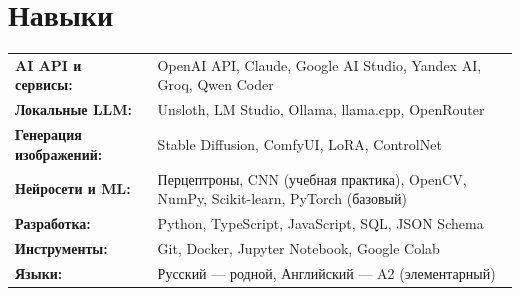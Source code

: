 \documentclass[10pt,a4paper]{article}
\begin{document}
\makeEducation

\section{Навыки}

\begin{tabular}{p{3.5cm} p{12cm}}
    \textbf{AI API и сервисы:} & OpenAI API, Claude, Google AI Studio, Yandex AI, Groq, Qwen Coder \\
    \textbf{Локальные LLM:} & Unsloth, LM Studio, Ollama, llama.cpp, OpenRouter \\
    \textbf{Генерация изображений:} & Stable Diffusion, ComfyUI, LoRA, ControlNet \\
    \textbf{Нейросети и ML:} & Перцептроны, CNN (учебная практика), OpenCV, NumPy, Scikit-learn, PyTorch (базовый) \\
    \textbf{Разработка:} & Python, TypeScript, JavaScript, SQL, JSON Schema \\
    \textbf{Инструменты:} & Git, Docker, Jupyter Notebook, Google Colab \\
    \textbf{Языки:} & Русский --- родной, Английский --- A2 (элементарный)
\end{tabular}

\end{document}
